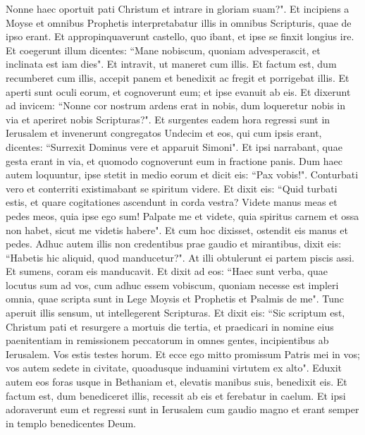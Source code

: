 \begin{biblechapter}
\verse Nonne haec oportuit pati Christum et intrare in gloriam suam?". 
\verse Et incipiens a Moyse et omnibus Prophetis interpretabatur illis in omnibus Scripturis, quae de ipso erant. 
\verse Et appropinquaverunt castello, quo ibant, et ipse se finxit longius ire. 
\verse Et coegerunt illum dicentes: “Mane nobiscum, quoniam advesperascit, et inclinata est iam dies". Et intravit, ut maneret cum illis. 
\verse Et factum est, dum recumberet cum illis, accepit panem et benedixit ac fregit et porrigebat illis.  
\verse Et aperti sunt oculi eorum, et cognoverunt eum; et ipse evanuit ab eis.  
\verse Et dixerunt ad invicem: “Nonne cor nostrum ardens erat in nobis, dum loqueretur nobis in via et aperiret nobis Scripturas?". 
\verse Et surgentes eadem hora regressi sunt in Ierusalem et invenerunt congregatos Undecim et eos, qui cum ipsis erant, 
\verse dicentes: “Surrexit Dominus vere et apparuit Simoni". 
\verse Et ipsi narrabant, quae gesta erant in via, et quomodo cognoverunt eum in fractione panis. 
\verse Dum haec autem loquuntur, ipse stetit in medio eorum et dicit eis: “Pax vobis!". 
\verse Conturbati vero et conterriti existimabant se spiritum videre.  
\verse Et dixit eis: “Quid turbati estis, et quare cogitationes ascendunt in corda vestra? 
\verse Videte manus meas et pedes meos, quia ipse ego sum! Palpate me et videte, quia spiritus carnem et ossa non habet, sicut me videtis habere".  
\verse Et cum hoc dixisset, ostendit eis manus et pedes. 
\verse Adhuc autem illis non credentibus prae gaudio et mirantibus, dixit eis: “Habetis hic aliquid, quod manducetur?". 
\verse At illi obtulerunt ei partem piscis assi. 
\verse Et sumens, coram eis manducavit. 
\verse Et dixit ad eos: “Haec sunt verba, quae locutus sum ad vos, cum adhuc essem vobiscum, quoniam necesse est impleri omnia, quae scripta sunt in Lege Moysis et Prophetis et Psalmis de me". 
\verse Tunc aperuit illis sensum, ut intellegerent Scripturas. 
\verse Et dixit eis: “Sic scriptum est, Christum pati et resurgere a mortuis die tertia, 
\verse et praedicari in nomine eius paenitentiam in remissionem peccatorum in omnes gentes, incipientibus ab Ierusalem. 
\verse Vos estis testes horum. 
\verse Et ecce ego mitto promissum Patris mei in vos; vos autem sedete in civitate, quoadusque induamini virtutem ex alto". 
\verse Eduxit autem eos foras usque in Bethaniam et, elevatis manibus suis, benedixit eis. 
\verse Et factum est, dum benediceret illis, recessit ab eis et ferebatur in caelum. 
\verse Et ipsi adoraverunt eum et regressi sunt in Ierusalem cum gaudio magno 
\verse et erant semper in templo benedicentes Deum.
\end{biblechapter}
